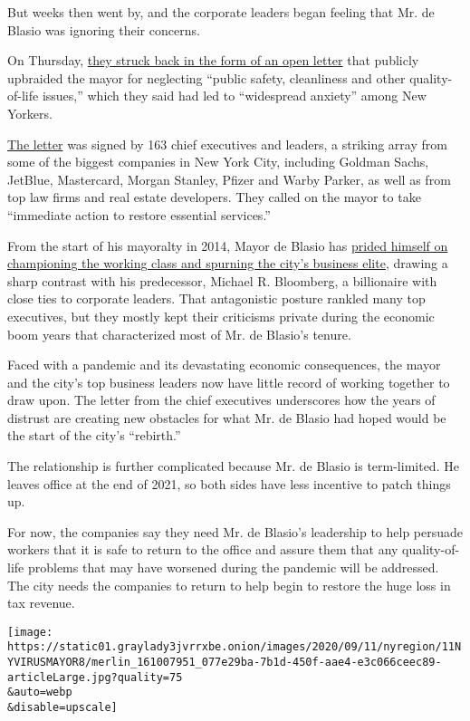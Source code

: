 But weeks then went by, and the corporate leaders began feeling that Mr.
de Blasio was ignoring their concerns.

On Thursday,
\href{https://www.nytimes3xbfgragh.onion/2020/09/10/nyregion/de-blasio-economy-coronavirus.html}{they
struck back in the form of an open letter} that publicly upbraided the
mayor for neglecting ``public safety, cleanliness and other
quality-of-life issues,'' which they said had led to ``widespread
anxiety'' among New Yorkers.

\href{https://pfnyc.org/news/letter-to-mayor-bill-de-blasio-from-nyc-business-leaders/}{The
letter} was signed by 163 chief executives and leaders, a striking array
from some of the biggest companies in New York City, including Goldman
Sachs, JetBlue, Mastercard, Morgan Stanley, Pfizer and Warby Parker, as
well as from top law firms and real estate developers. They called on
the mayor to take ``immediate action to restore essential services.''

From the start of his mayoralty in 2014, Mayor de Blasio has
\href{https://www.nytimes3xbfgragh.onion/2017/08/16/nyregion/bill-de-blasio-wall-street.html}{prided
himself on championing the working class and spurning the city's
business elite}, drawing a sharp contrast with his predecessor, Michael
R. Bloomberg, a billionaire with close ties to corporate leaders. That
antagonistic posture rankled many top executives, but they mostly kept
their criticisms private during the economic boom years that
characterized most of Mr. de Blasio's tenure.

Faced with a pandemic and its devastating economic consequences, the
mayor and the city's top business leaders now have little record of
working together to draw upon. The letter from the chief executives
underscores how the years of distrust are creating new obstacles for
what Mr. de Blasio had hoped would be the start of the city's
``rebirth.''

The relationship is further complicated because Mr. de Blasio is
term-limited. He leaves office at the end of 2021, so both sides have
less incentive to patch things up.

For now, the companies say they need Mr. de Blasio's leadership to help
persuade workers that it is safe to return to the office and assure them
that any quality-of-life problems that may have worsened during the
pandemic will be addressed. The city needs the companies to return to
help begin to restore the huge loss in tax revenue.

\texttt{[image: https://static01.graylady3jvrrxbe.onion/images/2020/09/11/nyregion/11NYVIRUSMAYOR8/merlin\_161007951\_077e29ba-7b1d-450f-aae4-e3c066ceec89-articleLarge.jpg?quality=75\\\&auto=webp\\\&disable=upscale]}

